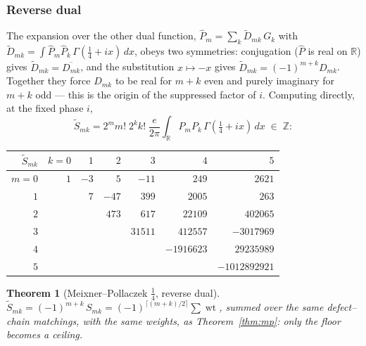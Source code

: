 \documentclass[11pt,a4paper]{article}
\newtheorem{theorem}{Theorem}[section]
\theoremstyle{definition}
\newcommand{\R}{\mathbb{R}}
\newcommand{\Z}{\mathbb{Z}}
\newcommand{\G}{\Gamma}
\begin{document}
\subsubsection*{Reverse dual}

The expansion over the other dual function,
$\widehat P_m = \sum_k \widetilde D_{mk}\, G_k$ with
$\widetilde D_{mk} = \int \widehat P_m \widehat P_k\,
\G(\tfrac14 + ix)\, dx$, obeys two symmetries: conjugation
($\widehat P$ is real on $\R$) gives
$\widetilde D_{mk} = \overline{D_{mk}}$, and the substitution
$x \mapsto -x$ gives $\widetilde D_{mk} = (-1)^{m+k} D_{mk}$.
Together they force $D_{mk}$ to be real for $m+k$ even and purely
imaginary for $m+k$ odd --- this is the origin of the suppressed
factor of $i$. Computing directly, at the fixed phase $i$,
\[
  \widetilde S_{mk} = 2^m m!\; 2^k k!\; \frac{e}{2\pi}
  \int_\R P_m P_k\, \G(\tfrac14+ix)\, dx \;\in\; \Z :
\]

\begin{tcolorbox}[colback=black!5, colframe=black!5, boxrule=0pt, sharp corners]
\begin{center}
\begin{tabular}{r|rrrrrr}
$\widetilde S_{mk}$ & $k=0$ & $1$ & $2$ & $3$ & $4$ & $5$ \\
\hline
$m=0$ & $1$ & $-3$ & $5$ & $-11$ & $249$ & $2621$ \\
$1$ &  & $7$ & $-47$ & $399$ & $2005$ & $263$ \\
$2$ &  &  & $473$ & $617$ & $22109$ & $402065$ \\
$3$ &  &  &  & $31511$ & $412557$ & $-3017969$ \\
$4$ &  &  &  &  & $-1916623$ & $29235989$ \\
$5$ &  &  &  &  &  & $-1012892921$ \\
\end{tabular}
\end{center}
\end{tcolorbox}

\begin{tcolorbox}[colback=blue!5, colframe=blue!5, boxrule=0pt, sharp corners]
\begin{theorem}[Meixner--Pollaczek $\tfrac14$, reverse dual]
\label{thm:mpdual}
$\widetilde S_{mk} = (-1)^{m+k}\, S_{mk}
= (-1)^{\lceil (m+k)/2 \rceil} \sum \operatorname{wt}$,
summed over the same defect--chain matchings, with the same weights,
as Theorem~\ref{thm:mp}: only the floor becomes a ceiling.
\end{theorem}
\end{tcolorbox}
\end{document}
